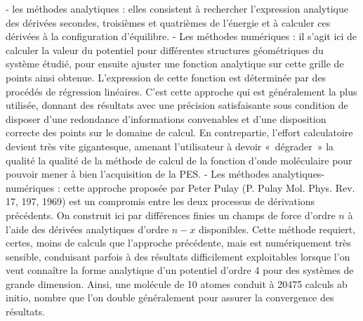 - les méthodes analytiques : elles consistent à rechercher l’expression analytique des dérivées secondes, troisièmes et quatrièmes de l’énergie et à calculer ces dérivées à la configuration d’équilibre. 
- Les méthodes numériques : il s’agit ici de calculer la valeur du potentiel pour différentes structures géométriques du système étudié, pour ensuite ajuster une fonction analytique sur cette grille de points ainsi obtenue. L’expression de cette fonction est déterminée par des procédés de régression linéaires. C’est cette approche qui est généralement la plus utilisée, donnant des résultats avec une précision satisfaisante sous condition de disposer d’une redondance d’informations convenables et d’une disposition correcte des points sur le domaine de calcul. En contrepartie, l’effort calculatoire devient très vite gigantesque, amenant l’utilisateur à devoir « dégrader » la qualité la qualité de la méthode de calcul de la fonction d’onde moléculaire pour pouvoir mener à bien l’acquisition de la PES. 
- Les méthodes analytiques-numériques : cette approche proposée par Peter Pulay (P. Pulay Mol. Phys. Rev. 17, 197, 1969) est un compromis entre les deux processus de dérivations précédents. On construit ici par différences finies un champs de force d’ordre $n$ à l’aide des dérivées analytiques d’ordre $n-x$ disponibles. Cette méthode requiert, certes, moins de calculs que l’approche précédente, mais est numériquement très sensible, conduisant parfois à des résultats difficilement exploitables lorsque l’on veut connaître la forme analytique d’un potentiel d’ordre 4 pour des systèmes de grande dimension. Ainsi, une molécule de 10 atomes conduit à 20475 calculs ab initio, nombre que l’on double généralement pour assurer la convergence des résultats. 

